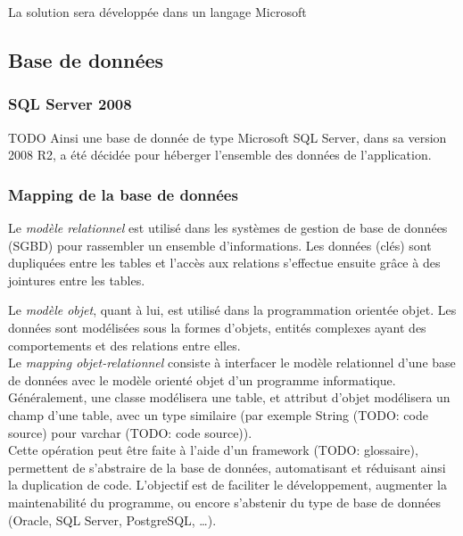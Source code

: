 La solution sera développée dans un langage Microsoft




\subsection{Base de données}


\subsubsection{SQL Server 2008}


TODO
Ainsi une base de donnée de type Microsoft SQL Server, dans sa version 2008 R2, a été décidée pour héberger l'ensemble des données de l'application.


\subsubsection{Mapping de la base de données}

Le \textit{modèle relationnel} est utilisé dans les systèmes de gestion de base de données (SGBD) pour rassembler un ensemble d'informations. Les données (clés) sont dupliquées entre les tables et l'accès aux relations s'effectue ensuite grâce à des jointures entre les tables.

Le \textit{modèle objet}, quant à lui, est utilisé dans la programmation orientée objet. Les données sont modélisées sous la formes d'objets, entités complexes ayant des comportements et des relations entre elles.
\\


Le \textit{mapping objet-relationnel} consiste à interfacer le modèle relationnel d'une base de données avec le modèle orienté objet d'un programme informatique. Généralement, une classe modélisera une table, et attribut d'objet modélisera un champ d'une table, avec un type similaire (par exemple String (TODO: code source) pour varchar (TODO: code source)).
\\


Cette opération peut être faite à l'aide d'un framework (TODO: glossaire), permettent de s'abstraire de la base de données, automatisant et réduisant ainsi la duplication de code. L'objectif est de faciliter le développement, augmenter la maintenabilité du programme, ou encore s'abstenir du type de base de données (Oracle, SQL Server, PostgreSQL, \ldots).
